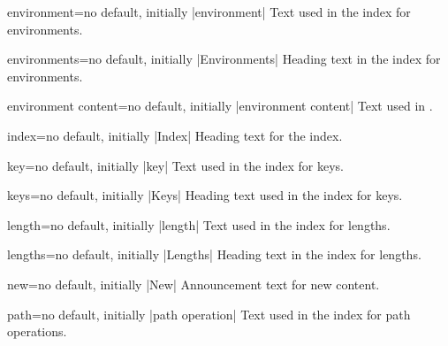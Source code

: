 \begin{langTcbKey}{environment}{=}{no default, initially |environment|}
  Text used in the index for environments.
\end{langTcbKey}

\begin{langTcbKey}{environments}{=}{no default, initially |Environments|}
  Heading text in the index for environments.
\end{langTcbKey}

\begin{langTcbKey}{environment content}{=}{no default, initially |environment content|}
  Text used in .
\end{langTcbKey}

\begin{langTcbKey}{index}{=}{no default, initially |Index|}
  Heading text for the index.
\end{langTcbKey}

\begin{langTcbKey}{key}{=}{no default, initially |key|}
  Text used in the index for keys.
\end{langTcbKey}

\begin{langTcbKey}{keys}{=}{no default, initially |Keys|}
  Heading text used in the index for keys.
\end{langTcbKey}

\begin{langTcbKey}[][doc new={2015-01-08}]{length}{=}{no default, initially |length|}
  Text used in the index for lengths.
\end{langTcbKey}

\begin{langTcbKey}[][doc new={2015-01-08}]{lengths}{=}{no default, initially |Lengths|}
  Heading text in the index for lengths.
\end{langTcbKey}

\begin{langTcbKey}[][doc new={2014-09-19}]{new}{=}{no default, initially |New|}
  Announcement text for new content.
\end{langTcbKey}

\begin{langTcbKey}[][doc new={2019-09-18}]{path}{=}{no default, initially |path operation|}
  Text used in the index for path operations.
\end{langTcbKey}

